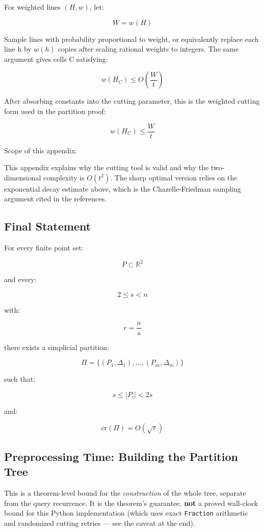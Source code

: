 \documentclass[
  11pt,
]{article}
\begin{document}
For weighted lines \((H,w)\), let:

\[
W=w(H)
\]

Sample lines with probability proportional to weight, or equivalently
replace each line h by \(w(h)\) copies after scaling rational weights to
integers. The same argument gives cells C satisfying:

\[
w(H_C)\le O\left(\frac Wt\right)
\]

After absorbing constants into the cutting parameter, this is the
weighted cutting form used in the partition proof:

\[
w(H_C)\le \frac Wt
\]

Scope of this appendix:

This appendix explains why the cutting tool is valid and why the
two-dimensional complexity is \(O(t^2)\). The sharp optimal version
relies on the exponential decay estimate above, which is the
Chazelle-Friedman sampling argument cited in the references.

\hypertarget{final-statement}{%
\subsection{Final Statement}\label{final-statement}}

For every finite point set:

\[
P\subset\mathbb R^2
\]

and every:

\[
2\le s< n
\]

with:

\[
r=\frac ns
\]

there exists a simplicial partition:

\[
\Pi=\lbrace (P_1,\Delta_1),\ldots,(P_m,\Delta_m) \rbrace
\]

such that:

\[
s\le |P_i|<2s
\]

and:

\[
\mathrm{cr}(\Pi)=O(\sqrt r)
\]

\hypertarget{preprocessing-time-building-the-partition-tree}{%
\subsection{Preprocessing Time: Building the Partition
Tree}\label{preprocessing-time-building-the-partition-tree}}

This is a theorem-level bound for the \emph{construction} of the whole
tree, separate from the query recurrence. It is the theorem's guarantee,
\textbf{not} a proved wall-clock bound for this Python implementation
(which uses exact \texttt{Fraction} arithmetic and randomized cutting
retries --- see the caveat at the end).
\end{document}
